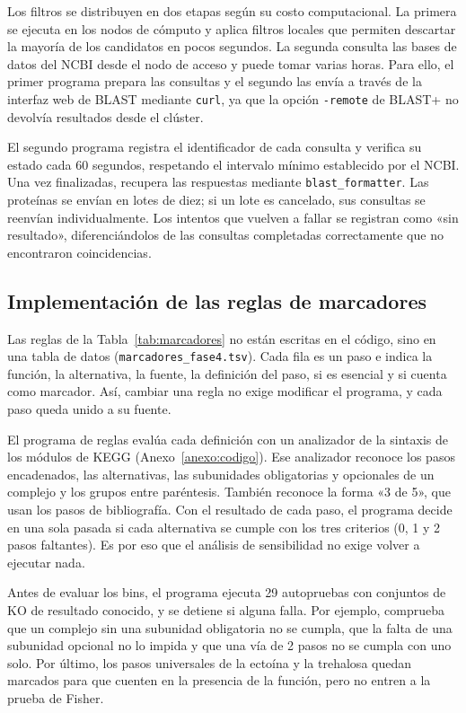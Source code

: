 Los filtros se distribuyen en dos etapas según su costo computacional. La primera se ejecuta en 
los nodos de cómputo y aplica filtros locales que permiten descartar la mayoría de los candidatos 
en pocos segundos. La segunda consulta las bases de datos del NCBI desde el nodo de acceso y puede 
tomar varias horas. Para ello, el primer programa prepara las consultas y el segundo las envía a 
través de la interfaz web de BLAST mediante \texttt{curl}, ya que la opción \texttt{-remote} de BLAST+ no devolvía resultados desde el clúster.

El segundo programa registra el identificador de cada consulta y verifica su estado cada 60 segundos,
respetando el intervalo mínimo establecido por el NCBI. Una vez finalizadas, recupera las respuestas
mediante \texttt{blast\_formatter}. Las proteínas se envían en lotes de diez; si un lote es cancelado,
sus consultas se reenvían individualmente. Los intentos que vuelven a fallar se registran como «sin 
resultado», diferenciándolos de las consultas completadas correctamente que no encontraron coincidencias.

\subsection{Implementación de las reglas de marcadores}
\label{subsec:impl_reglas}

\begin{nuevo}
Las reglas de la Tabla~\ref{tab:marcadores} no están escritas en el código,
sino en una tabla de datos (\texttt{marcadores\_fase4.tsv}). Cada fila es un
paso e indica la función, la alternativa, la fuente, la definición del paso, si
es esencial y si cuenta como marcador. Así, cambiar una regla no exige
modificar el programa, y cada paso queda unido a su fuente.

El programa de reglas evalúa cada definición con un analizador de la sintaxis de
los módulos de KEGG (Anexo~\ref{anexo:codigo}). Ese analizador reconoce los
pasos encadenados, las alternativas, las subunidades obligatorias y opcionales
de un complejo y los grupos entre paréntesis. También reconoce la forma «3 de
5», que usan los pasos de bibliografía. Con el resultado de cada paso, el
programa decide en una sola pasada si cada alternativa se cumple con los tres
criterios (0, 1 y 2 pasos faltantes). Es por eso que el análisis de
sensibilidad no exige volver a ejecutar nada.

Antes de evaluar los bins, el programa ejecuta 29 autopruebas con conjuntos de
KO de resultado conocido, y se detiene si alguna falla. Por ejemplo, comprueba
que un complejo sin una subunidad obligatoria no se cumpla, que la falta de una
subunidad opcional no lo impida y que una vía de 2 pasos no se cumpla con uno
solo. Por último, los pasos universales de la ectoína y la trehalosa quedan
marcados para que cuenten en la presencia de la función, pero no entren a la
prueba de Fisher.
\end{nuevo}

